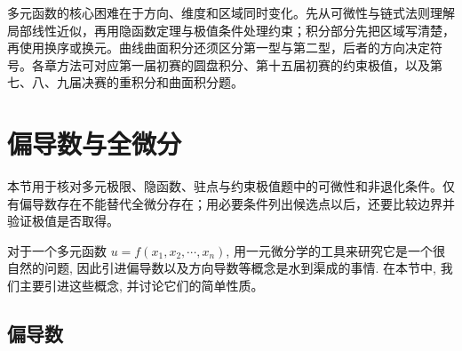 \documentclass[12pt,fontset=fandol]{ctexart}
\begin{document}
多元函数的核心困难在于方向、维度和区域同时变化。先从可微性与链式法则理解局部线性近似，再用隐函数定理与极值条件处理约束；积分部分先把区域写清楚，再使用换序或换元。曲线曲面积分还须区分第一型与第二型，后者的方向决定符号。各章方法可对应第一届初赛的圆盘积分、第十五届初赛的约束极值，以及第七、八、九届决赛的重积分和曲面积分题。

\section{偏导数与全微分}\label{course-14-1}
本节用于核对多元极限、隐函数、驻点与约束极值题中的可微性和非退化条件。仅有偏导数存在不能替代全微分存在；用必要条件列出候选点以后，还要比较边界并验证极值是否取得。

对于一个多元函数 $u=f(x_1,x_2,\cdots,x_n)$, 用一元微分学的工具来研究它是一个很自然的问题, 因此引进偏导数以及方向导数等概念是水到渠成的事情. 在本节中, 我们主要引进这些概念, 并讨论它们的简单性质。

\subsection{偏导数}
\end{document}
